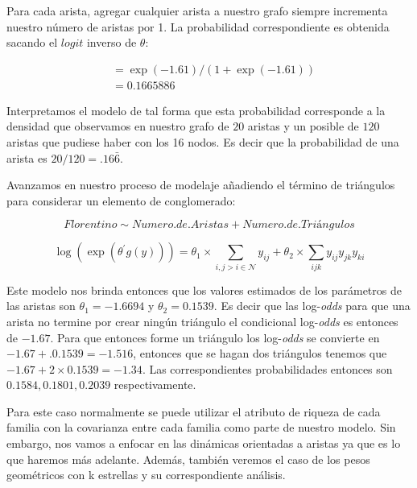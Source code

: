 Para cada arista, agregar cualquier arista a nuestro grafo siempre incrementa nuestro número de aristas por 1. La probabilidad correspondiente es obtenida sacando el $logit$ inverso de $\theta$:

\begin{equation*}
\begin{split}
    &= \exp (-1.61) /(1+\exp (-1.61))\\
    &= 0.1665886
\end{split}
\end{equation*}

Interpretamos el modelo de tal forma que esta probabilidad corresponde a la densidad que observamos en nuestro grafo de $20$ aristas y un posible de $120$ aristas que pudiese haber con los 16 nodos. Es decir que la probabilidad de una arista es $20/120=.16\bar{6}$.

Avanzamos en nuestro proceso de modelaje añadiendo el término de triángulos para considerar un elemento de conglomerado:

\begin{equation*}
    \textit{Florentino} \sim \textit{Numero.de.Aristas} + \textit{Numero.de.Triángulos}
\end{equation*}

\begin{equation*}
    \log \left( \exp \left( \theta ^ { \prime } g ( y ) \right) \right) = \theta _ { 1 } \times \sum _ { i , j > i \in \mathcal{N} } y _ { i j }  + \theta_2    \times \sum _ { i j k }  y _ { i j } y _ { j k } y _ { k i } 
\end{equation*}

Este modelo nos brinda entonces que los valores estimados de los parámetros de las aristas son $\theta_1 = -1.6694$ y $\theta_2 = 0.1539$. Es decir que las log-\textit{odds} para que una arista no termine por crear ningún triángulo el condicional log-\textit{odds} es entonces de $-1.67$. Para que entonces forme un triángulo los log-\textit{odds} se convierte en $-1.67+ .0.1539 = -1.516$, entonces que se hagan dos triángulos tenemos que $-1.67+2 \times 0.1539 = -1.34$. Las correspondientes probabilidades entonces son $0.1584, 0.1801, 0.2039$ respectivamente.

Para este caso normalmente se puede utilizar el atributo de riqueza de cada familia con la covarianza entre cada familia como parte de nuestro modelo. Sin embargo, nos vamos a enfocar en las dinámicas orientadas a aristas ya que es lo que haremos más adelante. Además, también veremos el caso de los pesos geométricos con k estrellas y su correspondiente análisis.

